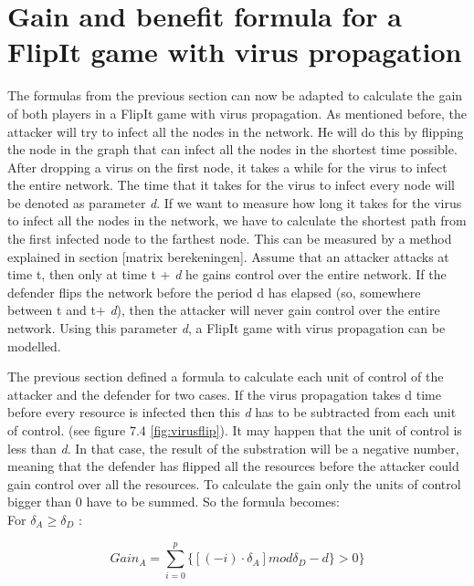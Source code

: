 \section{Gain and benefit formula for a FlipIt game with virus propagation}
\label{ch:8:GainVirus}
The formulas from the previous section can now be adapted to calculate the gain of both players in a FlipIt game with virus propagation. As mentioned before, the attacker will try to infect all the nodes in the network. He will do this by flipping the node in the graph that can infect all the nodes in the shortest time possible. After dropping a virus on the first node, it takes a while for the virus to infect the entire network. The time that it takes for the virus to infect every node will be denoted as parameter \textit{d}. If we want to measure how long it takes for the virus to infect all the nodes in the network, we have to calculate the shortest path from the
first infected node to the farthest node. This can be measured by a method explained in section [matrix berekeningen]. Assume that an attacker attacks at time t, then only at time t + \textit{d} he gains control over the entire network. If the defender flips the network before the period d has elapsed (so, somewhere between t and t+ \textit{d}), then the attacker will never gain control over the entire network. Using this parameter \textit{d}, a FlipIt game with virus propagation can be modelled.

The previous section defined a formula to calculate each unit of control of the attacker and the defender for two cases. If the virus propagation takes d time before every resource is infected then this \textit{d} has to be subtracted from each unit of control. (see figure 7.4 \ref{fig:virusflip}). It may happen that the unit of control is less than \textit{d}. In that case, the result of the substration will be a negative number, meaning that the defender has flipped all the resources before the attacker could gain control over all the resources. To calculate the gain only the units of control bigger than 0 have to be summed. So the formula becomes: \\


For $\delta_{A} \geq \delta_{D}$ :

\begin{equation}\label{first}
Gain_{A} = \sum_{i=0}^{p} \lbrace [( - i ) \cdot \delta_{A}] mod \delta_{D} - d \rbrace  > 0 \rbrace 
\end{equation}

